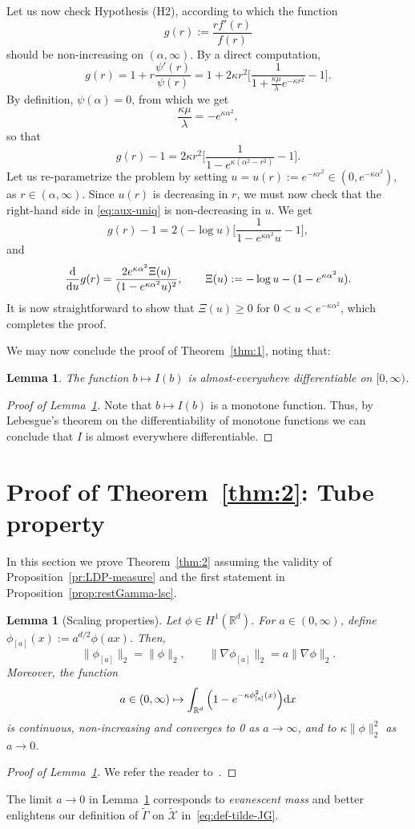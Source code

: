 \documentclass[a4paper,11pt]{amsart}
\numberwithin{equation}{section}
\newtheorem{lemma}[theorem]{Lemma}
\newcommand{\bbR}{{\ensuremath{\mathbb R}} }
\newcommand{\cX}{{\ensuremath{\mathcal X}} }
\newcommand{\ga}{\alpha}
\newcommand{\gk}{\kappa}
\newcommand{\gl}{\lambda}
\renewcommand{\tilde}{\widetilde}          %
\newcommand{\dd}{\text{\rm d}}             %
\newcommand{\8}{\infty}
\newcommand{\beq}{\begin{equation}}
\newcommand{\eeq}{\end{equation}}
\begin{document}
Let us now check Hypothesis (H2), according to which the function
\beq
g(r) := \frac{rf'(r)}{f(r)} 
\eeq
should be non-increasing on $(\ga,\infty)$. By a direct computation,
\beq
g(r) = 1 + r \frac{\psi'(r)}{\psi(r)} = 1 + 2\gk r^2
\Big[ \frac{1}{1 + \frac{\gk \mu}{\gl} e^{-\gk r^2}} - 1\Big].
\eeq
By definition, $\psi(\ga)=0$, from which we get
\beq
\frac{\gk \mu}{\gl} = - e^{\gk \ga^2},
\eeq
so that
\beq
\label{eq:aux-uniq}
g(r) -1 = 2\gk r^2
\Big[ \frac{1}{1 - e^{\gk(\ga^2- r^2)}} - 1\Big].
\eeq
Let us re-parametrize the problem by setting $u=u(r):=e^{-\gk r^2} \in (0, e^{-\gk \ga^2})$, as $r\in (\ga, \infty)$. Since $u(r)$ is decreasing in $r$, we must now check that the right-hand side in \eqref{eq:aux-uniq} is non-decreasing in $u$. We get
\beq
g(r) -1 = 2(-\log u) \Big[\frac{1}{1- e^{\gk \ga^2}u} - 1 \Big],
\eeq
and
\beq
\frac{\dd}{\dd u}g(r) = \frac{2e^{\gk \ga^2}\Xi(u)}{(1- e^{\gk \ga^2}u)^2},
\qquad \Xi(u) := -\log u  - (1 - e^{\gk\ga^2}u).
\eeq
It is now straightforward to show that $\Xi(u)\ge 0$ for $0 < u < e^{-\gk\ga^2}$, which completes the proof.\\
%
\par We may now	conclude the proof of Theorem~\ref{thm:1}, noting that:
\begin{lemma}\label{lem:differentiability}
	The function $b\mapsto I(b)$ is almost-everywhere differentiable on $[0,\infty)$.
\end{lemma}
\begin{proof}[Proof of Lemma~\ref{lem:differentiability}]
	Note that $b\mapsto I(b)$ is a monotone function. Thus, by Lebesgue's theorem on the differentiability of monotone functions we can conclude that $I$ is almost everywhere differentiable.
	\end{proof}
%
\section{Proof of Theorem~\ref{thm:2}: Tube property}
\label{sec:tube}
In this section we prove Theorem~\ref{thm:2} assuming the validity of Proposition~\ref{pr:LDP-measure} and the first statement in Proposition~\ref{prop:restGamma-lsc}.
%

\begin{lemma}[Scaling properties]
\label{lem:scaling}
Let $\phi\in H^1(\bbR^d)$. For $a\in (0,\infty)$, define $\phi_{[a]}(x):= a^{d/2}\phi(ax)$. Then,
\beq
\|\phi_{[a]}\|_2 = \|\phi\|_2, \qquad \|\nabla\phi_{[a]}\|_2 = a \|\nabla\phi\|_2.
\eeq
Moreover, the function
\beq
a\in(0,\infty) \mapsto \int_{\bbR^d} \Big(1-e^{-\gk \phi_{[a]}^2(x)}\Big) \dd x
\eeq
is continuous, non-increasing and converges to 0 as $a\to \infty$, and to $\gk\|\phi\|_2^2$ as $a\to 0$.
\end{lemma}
%
\begin{proof}[Proof of Lemma~\ref{lem:scaling}]
We refer the reader to~\cite[Section 5, proof of Lemma 12]{BBH2001}.
\end{proof}
The limit $a\to 0$ in Lemma~\ref{lem:scaling} corresponds to {\it evanescent mass} and better enlightens our definition of $\tilde \Gamma$ on $\tilde\cX$ in~\eqref{eq:def-tilde-JG}.
\end{document}

